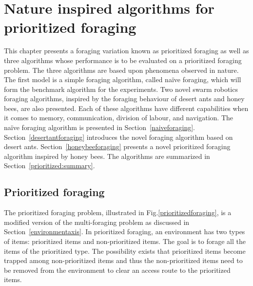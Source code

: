 
\chapter{Nature inspired algorithms for prioritized foraging}
\label{chap:third}


This chapter presents a foraging variation known as prioritized foraging as well as three algorithms whose performance is to be evaluated on a prioritized foraging problem. The three algorithms are based upon phenomena observed in nature. The first model is a simple foraging algorithm, called na\"ive foraging, which will form the benchmark algorithm for the experiments. Two novel swarm robotics foraging algorithms, inspired by the foraging behaviour of desert ants and honey bees, are also presented. Each of these algorithms have different capabilities when it comes to memory, communication, division of labour, and navigation. The na\"ive foraging algorithm is presented in Section~\ref{naiveforaging}. Section~\ref{desertantforaging} introduces the novel foraging algorithm based on desert ants. Section~\ref{honeybeeforaging} presents a novel prioritized foraging algorithm inspired by honey bees. The algorithms are summarized in Section~\ref{prioritized:summary}.

\section{Prioritized foraging}
\label{sec:second:prioritizedforaging}


The prioritized foraging problem, illustrated in Fig.\ref{prioritizedforaging}, is a modified version of the multi-foraging problem as discussed in Section~\ref{environmentaxis}. In prioritized foraging, an environment has two types of items: prioritized items and non-prioritized items. The goal is to forage all the items of the prioritized type. The possibility exists that prioritized items become trapped among non-prioritized items and thus the non-prioritized items need to be removed from the environment to clear an access route to the prioritized items. 

